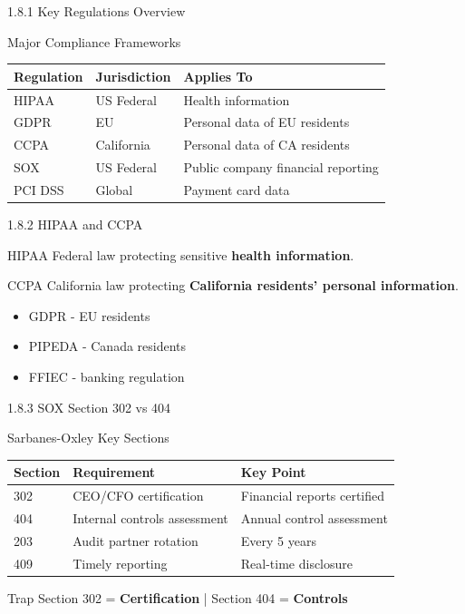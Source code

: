 \documentclass{beamer}
\begin{document}
	\begin{frame}{1.8.1 Key Regulations Overview}
		\begin{block}{Major Compliance Frameworks}
			\begin{tabular}{|p{2.5cm}|p{4cm}|p{4.5cm}|}
				\hline
				\textbf{Regulation} & \textbf{Jurisdiction} & \textbf{Applies To} \\
				\hline
				HIPAA & US Federal & Health information \\
				\hline
				GDPR & EU & Personal data of EU residents \\
				\hline
				CCPA & California & Personal data of CA residents \\
				\hline
				SOX & US Federal & Public company financial reporting \\
				\hline
				PCI DSS & Global & Payment card data \\
				\hline
			\end{tabular}
		\end{block}
	\end{frame}
	
	\begin{frame}{1.8.2 HIPAA and CCPA}
		\begin{block}{HIPAA}
			Federal law protecting sensitive \textbf{health information}.
		\end{block}
		\begin{block}{CCPA}
			California law protecting \textbf{California residents' personal information}.
		\end{block}
		\begin{itemize}
			\item GDPR - EU residents
			\item PIPEDA - Canada residents
			\item FFIEC - banking regulation
		\end{itemize}
	\end{frame}
	
	\begin{frame}{1.8.3 SOX Section 302 vs 404}
		\begin{block}{Sarbanes-Oxley Key Sections}
			\begin{tabular}{|p{2cm}|p{4cm}|p{5cm}|}
				\hline
				\textbf{Section} & \textbf{Requirement} & \textbf{Key Point} \\
				\hline
				302 & CEO/CFO certification & Financial reports certified \\
				\hline
				404 & Internal controls assessment & Annual control assessment \\
				\hline
				203 & Audit partner rotation & Every 5 years \\
				\hline
				409 & Timely reporting & Real-time disclosure \\
				\hline
			\end{tabular}
		\end{block}
		\begin{alertblock}{Trap}
			Section 302 = \textbf{Certification} | Section 404 = \textbf{Controls}
		\end{alertblock}
	\end{frame}
	
\end{document}
